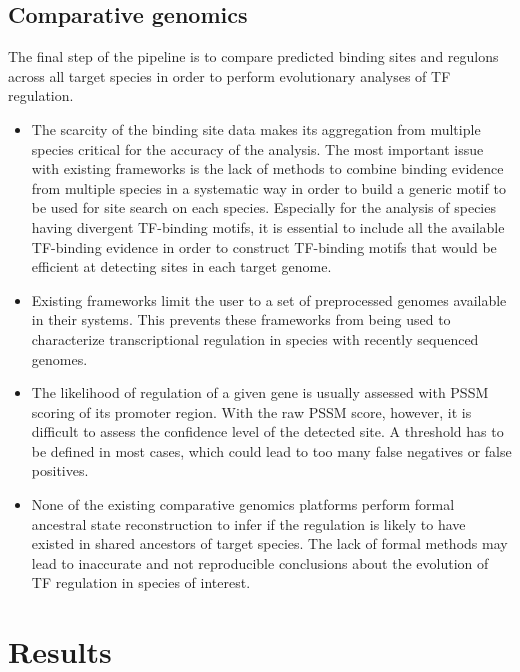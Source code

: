\documentclass[12pt]{article}
\begin{document}
\subsection{Comparative genomics}

The final step of the pipeline is to compare predicted binding sites and
regulons across all target species in order to perform evolutionary analyses of
TF regulation.

\begin{itemize}
\item The scarcity of the binding site data makes its aggregation from multiple
  species critical for the accuracy of the analysis. The most important issue
  with existing frameworks is the lack of methods to combine binding evidence
  from multiple species in a systematic way in order to build a generic motif
  to be used for site search on each species. Especially for the analysis of
  species having divergent TF-binding motifs, it is essential to include all
  the available TF-binding evidence in order to construct TF-binding motifs
  that would be efficient at detecting sites in each target genome.

\item Existing frameworks limit the user to a set of preprocessed genomes
  available in their systems. This prevents these frameworks from being used to
  characterize transcriptional regulation in species with recently sequenced
  genomes.

\item The likelihood of regulation of a given gene is usually assessed with PSSM
  scoring of its promoter region. With the raw PSSM score, however, it is difficult to
  assess the confidence level of the detected site. A threshold has to be
  defined in most cases, which could lead to too many false negatives or false
  positives.

\item None of the existing comparative genomics platforms perform formal
  ancestral state reconstruction to infer if the regulation is likely to have
  existed in shared ancestors of target species. The lack of formal methods may
  lead to inaccurate and not reproducible conclusions about the evolution of TF
  regulation in species of interest.
\end{itemize}

\section{Results}
\end{document}
